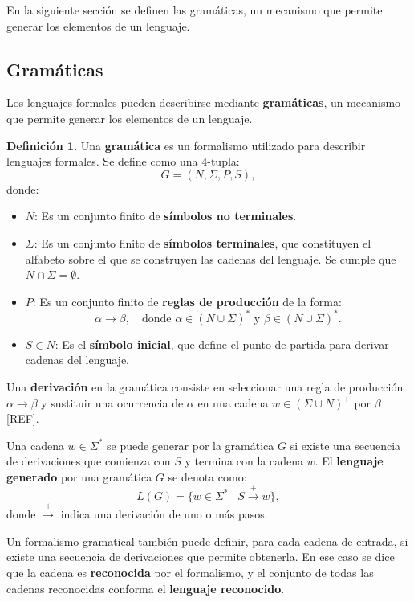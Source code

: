\documentclass{report}
\theoremstyle{definition}
\newtheorem{definicion}{Definición}[chapter]
\theoremstyle{plain}
\theoremstyle{remark}
\begin{document}
En la siguiente sección se definen las gramáticas, un mecanismo que permite
generar los elementos de un lenguaje.

\subsection{Gramáticas}
\label{sec:gramaticas}

Los lenguajes formales pueden describirse mediante \textbf{gramáticas}, un
mecanismo que permite generar los elementos de un lenguaje.

\begin{definicion}
Una \textbf{gramática} es un formalismo utilizado para describir lenguajes
formales. Se define como una $4$-tupla:
\[
  G = (N, \Sigma, P, S),
\]
donde:
\begin{itemize}
  \item $N$: Es un conjunto finito de \textbf{símbolos no terminales}.
  \item $\Sigma$: Es un conjunto finito de \textbf{símbolos terminales},
    que constituyen el alfabeto sobre el que se construyen las cadenas
    del lenguaje. Se cumple que $N \cap \Sigma = \emptyset$.
  \item $P$: Es un conjunto finito de \textbf{reglas de producción} de la
    forma:
    \[
      \alpha \to \beta, \quad \text{donde } \alpha \in (N \cup \Sigma)^*
      \text{ y } \beta \in (N \cup \Sigma)^*.
    \]
  \item $S \in N$: Es el \textbf{símbolo inicial}, que define el punto de
    partida para derivar cadenas del lenguaje.
\end{itemize}
\end{definicion}

Una \textbf{derivación} en la gramática consiste en seleccionar una regla
de producción $\alpha \to \beta$ y sustituir una ocurrencia de $\alpha$
en una cadena $w \in (\Sigma \cup N)^+$ por $\beta$ [REF].

Una cadena $w \in \Sigma^*$ se puede generar por la gramática $G$ si existe
una secuencia de derivaciones que comienza con $S$ y termina con la cadena
$w$. El \textbf{lenguaje generado} por una gramática $G$ se denota como:
\[
  L(G) = \{ w \in \Sigma^* \mid S \xrightarrow{+} w \},
\]
donde $\xrightarrow{+}$ indica una derivación de uno o más pasos.

Un formalismo gramatical también puede definir, para cada cadena de
entrada, si existe una secuencia de derivaciones que permite obtenerla. En
ese caso se dice que la cadena es \textbf{reconocida} por el formalismo, y
el conjunto de todas las cadenas reconocidas conforma el \textbf{lenguaje
reconocido}.
\end{document}
